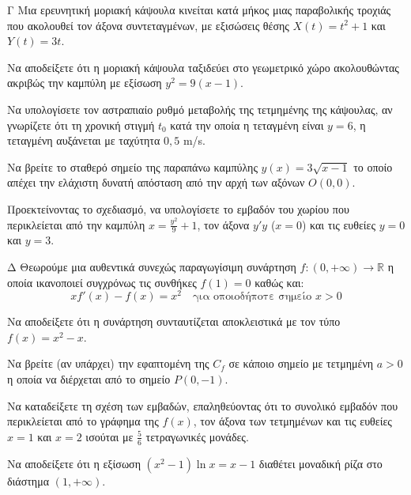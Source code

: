 \begin{thema}{Γ}
Μια ερευνητική μοριακή κάψουλα κινείται κατά μήκος μιας παραβολικής τροχιάς που ακολουθεί τον άξονα συντεταγμένων, με εξισώσεις θέσης $X(t) = t^2+1$ και $Y(t) = 3t$.
\begin{erwthma}
    \item Να αποδείξετε ότι η μοριακή κάψουλα ταξιδεύει στο γεωμετρικό χώρο ακολουθώντας ακριβώς την καμπύλη με εξίσωση $y^2 = 9(x-1)$. 
    \item Να υπολογίσετε τον αστραπιαίο ρυθμό μεταβολής της τετμημένης της κάψουλας, αν γνωρίζετε ότι τη χρονική στιγμή $t_0$ κατά την οποία η τεταγμένη είναι $y=6$, η τεταγμένη αυξάνεται με ταχύτητα $0,5$ m/s. 
    \item Να βρείτε το σταθερό σημείο της παραπάνω καμπύλης $y(x) = 3\sqrt{x-1}$ το οποίο απέχει την ελάχιστη δυνατή απόσταση από την αρχή των αξόνων $O(0,0)$. 
    \item Προεκτείνοντας το σχεδιασμό, να υπολογίσετε το εμβαδόν του χωρίου που περικλείεται από την καμπύλη $x = \frac{y^2}{9} + 1$, τον άξονα $y'y$ ($x=0$) και τις ευθείες $y=0$ και $y=3$. 
\end{erwthma}
\end{thema}

\begin{thema}{Δ}
Θεωρούμε μια αυθεντικά συνεχώς παραγωγίσιμη συνάρτηση $f: (0,+\infty) \to \mathbb{R}$ η οποία ικανοποιεί συγχρόνως τις συνθήκες $f(1)=0$ καθώς και:
\[ x f'(x) - f(x) = x^2 \quad \text{για οποιοδήποτε σημείο } x>0 \]
\begin{erwthma}
    \item Να αποδείξετε ότι η συνάρτηση συνταυτίζεται αποκλειστικά με τον τύπο $f(x) = x^2 - x$. 
    \item Να βρείτε (αν υπάρχει) την εφαπτομένη της $C_f$ σε κάποιο σημείο με τετμημένη $a > 0$ η οποία να διέρχεται από το σημείο $P(0, -1)$. 
    \item Να καταδείξετε τη σχέση των εμβαδών, επαληθεύοντας ότι το συνολικό εμβαδόν που περικλείεται από το γράφημα της $f(x)$, τον άξονα των τετμημένων και τις ευθείες $x=1$ και $x=2$ ισούται με $\frac{5}{6}$ τετραγωνικές μονάδες. 
    \item Να αποδείξετε ότι η εξίσωση $(x^2-1)\ln x = x - 1$ διαθέτει μοναδική ρίζα στο διάστημα $(1, +\infty)$. 
\end{erwthma}
\end{thema}

